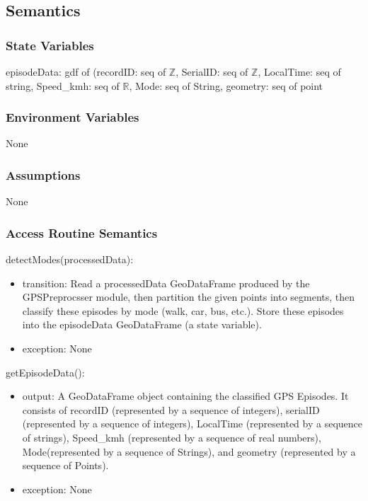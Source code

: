 \documentclass[12pt, titlepage]{article}
\begin{document}
\subsection{Semantics}

\subsubsection{State Variables}

episodeData: gdf of (recordID: seq of $\mathbb{Z}$, SerialID: seq of $\mathbb{Z}$, LocalTime: seq of string, Speed\_kmh: seq of $\mathbb{R}$, Mode: seq of String, geometry: seq of point

\subsubsection{Environment Variables}

None

\subsubsection{Assumptions}

None

\subsubsection{Access Routine Semantics}

\noindent detectModes(processedData):
\begin{itemize}
\item transition: Read a processedData GeoDataFrame produced by the GPSPreprocsser module, then partition the given points into segments, then classify these episodes by mode (walk, car, bus, etc.). Store these episodes into the episodeData GeoDataFrame (a state variable).
\item exception: None
\end{itemize}

\noindent getEpisodeData():
\begin{itemize}

\item output: A GeoDataFrame object containing the classified GPS Episodes.  It consists of recordID (represented by a sequence of integers), serialID (represented by a sequence of integers), LocalTime (represented by a sequence of strings), Speed\_kmh (represented by a sequence of real numbers), Mode(represented by a sequence of Strings), and geometry (represented by a sequence of Points).
\item exception: None
\end{itemize}
\end{document}
